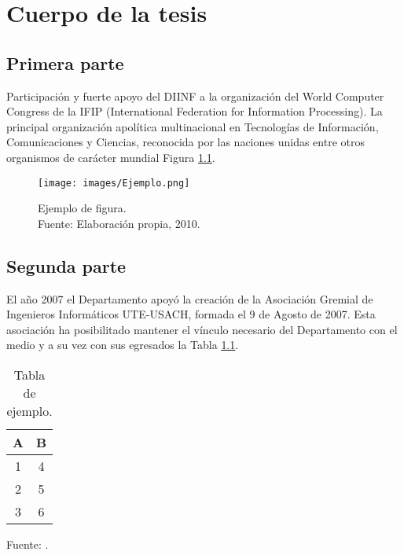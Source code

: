 \chapter{Cuerpo de la tesis}
\label{cap:cuerpo}

\section{Primera parte}
\label{sec:primera}
Participación y fuerte apoyo del DIINF a la organización del World Computer Congress de la IFIP (International Federation for Information Processing). La principal organización apolítica multinacional en Tecnologías de Información, Comunicaciones y Ciencias, reconocida por las naciones unidas entre otros organismos de carácter mundial Figura \ref{fig:ejemplo}.

\begin{figure}[!ht]
	\centering
	\captionsetup{justification=centering}
	\texttt{[image: images/Ejemplo.png]}
	\caption[Ejemplo de figura.]{Ejemplo de figura.\\Fuente: Elaboraci\'on propia, 2010.}
	\label{fig:ejemplo}
\end{figure}

\section{Segunda parte}
\label{sec:segunda}

El año 2007 el Departamento apoyó la creación de la Asociación Gremial de Ingenieros Informáticos UTE-USACH, formada el 9 de Agosto de 2007. Esta asociación ha posibilitado mantener el vínculo necesario del Departamento con el medio y a su vez con sus egresados la Tabla \ref{tab:ejemplo}.

\begin{table}[!ht]
	\begin{center}
		\caption{Tabla de ejemplo.}
		\begin{tabular}{| c | c |}
			\hline
			A & B \\ \hline
			1 & 4 \\
			2 & 5 \\
			3 & 6 \\\hline
		\end{tabular}
		\label{tab:ejemplo}
	\end{center}
	\begin{center}
		Fuente: \cite{MeriaudeauS15}.
	\end{center}
\end{table}

